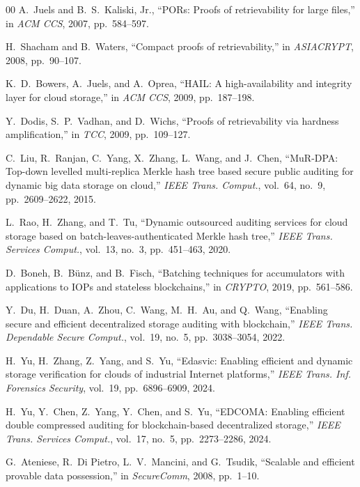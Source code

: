 \documentclass[lettersize,journal]{IEEEtran}
\begin{document}
\begin{thebibliography}{00}
A.~Juels and B.~S.~Kaliski, Jr.,
``PORs: Proofs of retrievability for large files,''
in \emph{ACM CCS}, 2007, pp.~584--597.

H.~Shacham and B.~Waters,
``Compact proofs of retrievability,''
in \emph{ASIACRYPT}, 2008, pp.~90--107.

K.~D.~Bowers, A.~Juels, and A.~Oprea,
``HAIL: A high-availability and integrity layer for cloud storage,''
in \emph{ACM CCS}, 2009, pp.~187--198.

Y.~Dodis, S.~P.~Vadhan, and D.~Wichs,
``Proofs of retrievability via hardness amplification,''
in \emph{TCC}, 2009, pp.~109--127.

C.~Liu, R.~Ranjan, C.~Yang, X.~Zhang, L.~Wang, and J.~Chen,
``MuR-DPA: Top-down levelled multi-replica Merkle hash tree based secure public auditing for dynamic big data storage on cloud,''
\emph{IEEE Trans. Comput.}, vol.~64, no.~9, pp.~2609--2622, 2015.

L.~Rao, H.~Zhang, and T.~Tu,
``Dynamic outsourced auditing services for cloud storage based on batch-leaves-authenticated Merkle hash tree,''
\emph{IEEE Trans. Services Comput.}, vol.~13, no.~3, pp.~451--463, 2020.

D.~Boneh, B.~B{\"u}nz, and B.~Fisch,
``Batching techniques for accumulators with applications to IOPs and stateless blockchains,''
in \emph{CRYPTO}, 2019, pp.~561--586.

Y.~Du, H.~Duan, A.~Zhou, C.~Wang, M.~H.~Au, and Q.~Wang,
``Enabling secure and efficient decentralized storage auditing with blockchain,''
\emph{IEEE Trans. Dependable Secure Comput.}, vol.~19, no.~5, pp.~3038--3054, 2022.

H.~Yu, H.~Zhang, Z.~Yang, and S.~Yu,
``Edasvic: Enabling efficient and dynamic storage verification for clouds of industrial Internet platforms,''
\emph{IEEE Trans. Inf. Forensics Security}, vol.~19, pp.~6896--6909, 2024.

H.~Yu, Y.~Chen, Z.~Yang, Y.~Chen, and S.~Yu,
``EDCOMA: Enabling efficient double compressed auditing for blockchain-based decentralized storage,''
\emph{IEEE Trans. Services Comput.}, vol.~17, no.~5, pp.~2273--2286, 2024.

G.~Ateniese, R.~Di Pietro, L.~V.~Mancini, and G.~Tsudik,
``Scalable and efficient provable data possession,''
in \emph{SecureComm}, 2008, pp.~1--10.


\end{thebibliography}
\end{document}

